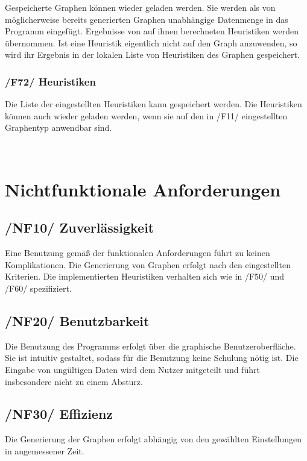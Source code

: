 \documentclass{article}
\begin{document}
	Gespeicherte Graphen können wieder geladen werden. Sie werden als von möglicherweise bereits generierten Graphen unabhängige Datenmenge in das Programm eingefügt. Ergebnisse von auf ihnen berechneten Heuristiken werden übernommen. Ist eine Heuristik eigentlich nicht auf den Graph anzuwenden, so wird ihr Ergebnis in der lokalen Liste von Heuristiken des Graphen gespeichert.
		
	\subsubsection*{/F72/ Heuristiken} \label{f72} 
	Die Liste der eingestellten Heuristiken kann gespeichert werden. Die Heuristiken können auch wieder geladen werden, wenn sie auf den in /F11/ eingestellten Graphentyp anwendbar sind.
	
	~\newpage
	\section{Nichtfunktionale Anforderungen}
	\subsection*{/NF10/ Zuverlässigkeit} \label{nf10} 
	Eine Benutzung gemäß der funktionalen Anforderungen führt zu keinen Komplikationen. Die Generierung von Graphen erfolgt nach den eingestellten Kriterien. Die implementierten Heuristiken verhalten sich wie in /F50/ und /F60/ spezifiziert.
	
	\subsection*{/NF20/ Benutzbarkeit} \label{nf20} 
	Die Benutzung des Programms erfolgt über die graphische Benutzeroberfläche. Sie ist intuitiv gestaltet, sodass für die Benutzung keine Schulung nötig ist. Die Eingabe von ungültigen Daten wird dem Nutzer mitgeteilt und führt insbesondere nicht zu einem Absturz.
	
	\subsection*{/NF30/ Effizienz} \label{nf30} 
	Die Generierung der Graphen erfolgt abhängig von den gewählten Einstellungen in angemessener Zeit.
	
\end{document}
